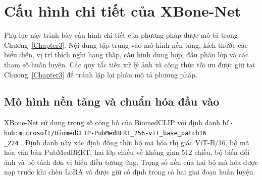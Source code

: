 \chapter{Cấu hình chi tiết của XBone-Net}
\label{AppendixModelDetails}

Phụ lục này trình bày cấu hình chi tiết của phương pháp được mô tả trong Chương~\ref{Chapter3}. Nội dung tập trung vào mô hình nền tảng, kích thước các biểu diễn, vị trí thích nghi hạng thấp, cấu hình dung hợp, đầu phân lớp và các tham số huấn luyện. Các quy tắc tiền xử lý ảnh và công thức tối ưu được giữ tại Chương~\ref{Chapter3} để tránh lặp lại phần mô tả phương pháp.

\section{Mô hình nền tảng và chuẩn hóa đầu vào}

XBone-Net sử dụng trọng số công bố của BiomedCLIP với định danh \texttt{hf-hub:microsoft/BiomedCLIP-PubMedBERT\_256-vit\_base\_patch16\\\_224} \cite{BiomedCLIP}. Định danh này xác định đồng thời bộ mã hóa thị giác ViT-B/16, bộ mã hóa văn bản PubMedBERT, hai lớp chiếu về không gian 512 chiều, bộ biến đổi ảnh và bộ tách đơn vị biểu diễn tương ứng. Trọng số nền của hai bộ mã hóa được nạp trước khi chèn LoRA và được giữ cố định trong cả hai giai đoạn huấn luyện.

\begin{table}[H]
\centering
\small
{}
\caption{Cấu hình đầu vào và mô hình nền tảng của XBone-Net}
\label{tab:appendix-model-input-config}
\end{table}

